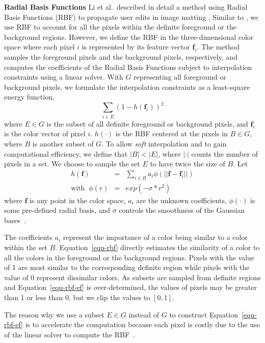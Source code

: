 \textbf{Radial Basis Functions}
Li et al.\ described in detail a method using Radial Basis Functions (RBF) to propagate user edits in image matting \cite{li2010}.
Similar to \cite{li2010}, we use RBF to account for all the pixels within the definite foreground or the background regions.
However, we define the RBF in the three-dimensional color space where each pixel $i$ is represented by its feature vector $\mathbf{f}_{i}$.
The method samples the foreground pixels and the background pixels, respectively, and computes the coefficients of the Radial Basis Functions subject to interpolation constraints using a linear solver.
With $G$ representing all foreground or background pixels, we formulate the interpolation constraints as a least-square energy function, 
\begin{equation}
\label{equ-rbf-ef}
\sum_{i\in E}{(1-h(\mathbf{f}_{i}))^2}
\end{equation}
where $E\in G$ is the subset of all definite foreground or background pixels, and $\mathbf{f}_{i}$ is the color vector of pixel $i$.
$h(\cdot)$ is the RBF centered at the pixels in $B\in G$, where $B$ is another subset of $G$.
To allow {\em soft} interpolation and to gain computational efficiency, we define that $|B| < |E|$, where $|\cdot|$ counts the number of pixels in a set. We choose to sample the set $E$ to have twice the size of $B$. Let
\begin{eqnarray}
\label{equ-rbf}
h(\mathbf{f})&=&\sum_{i\in B}{a_{i}\phi(||\mathbf{f}-\mathbf{f}_{i}||)} \\
\mbox{with}\;\;
\phi(r)&=&exp(-\sigma *r^2) \nonumber
\end{eqnarray}
where $\mathbf{f}$ is any point in the color space, $a_{i}$ are the unknown coefficients, $\phi(\cdot)$ is some pre-defined radial basis, and $\sigma$ controls the smoothness of the Gaussian bases~\cite{li2010}.

The coefficients $a_{i}$ represent the importance of a color being similar to a color within the set $B$. Equation~\ref{equ-rbf} directly estimates the similarity of a color to all the colors in the foreground or the background regions. Pixels with the value of 1 are most similar to the corresponding definite region while pixels with the value of 0 represent dissimilar colors. As subsets are sampled from definite regions and Equation~\ref{equ-rbf-ef} is over-determined, the values of pixels may be greater than 1 or less than 0, but we clip the values to $[0,1]$.

The reason why we use a subset $E\in G$ instead of $G$ to construct Equation~\ref{equ-rbf-ef} is to accelerate the computation because each pixel is costly due to the use of the linear solver to compute the RBF~\cite{tao2012}.

